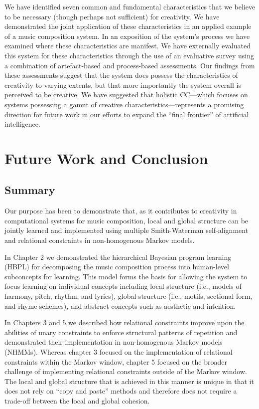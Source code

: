 \documentclass[phd,electronic,oneside,twosidetoc,letterpaper,chaptercenter,parttop,lof,lot]{byumsphd}
\begin{document}
We have identified seven common and fundamental characteristics that we believe to be necessary (though perhaps not sufficient) for creativity. We have demonstrated the joint application of these characteristics in an applied example of a music composition system. In an exposition of the system's process we have examined where these characteristics are manifest. We have externally evaluated this system for these characteristics through the use of an evaluative survey using a combination of artefact-based and process-based assessments. Our findings from these assessments suggest that the system does possess the characteristics of creativity to varying extents, but that more importantly the system overall is perceived to be creative. We have suggested that holistic CC---which focuses on systems possessing a gamut of creative characteristics---represents a promising direction for future work in our efforts to expand the ``final frontier'' of artificial intelligence.

\chapter{Future Work and Conclusion}

\section{Summary}

Our purpose has been to demonstrate that, as it contributes to creativity in computational systems for music composition, local and global structure can be jointly learned and implemented using multiple Smith-Waterman self-alignment and relational constraints in non-homogenous Markov models.

In Chapter 2 we demonstrated the hierarchical Bayesian program learning (HBPL) for decomposing the music composition process into human-level subconcepts for learning. This model forms the basis for allowing the system to focus learning on individual concepts including local structure (i.e., models of harmony, pitch, rhythm, and lyrics), global structure (i.e., motifs, sectional form, and rhyme schemes), and abstract concepts such as aesthetic and intention.

In Chapters 3 and 5 we described how relational constraints improve upon the abilities of unary constraints to enforce structural patterns of repetition and demonstrated their implementation in non-homogenous Markov models (NHMMs). Whereas chapter 3 focused on the implementation of relational constraints within the Markov window, chapter 5 focused on the broader challenge of implementing relational constraints outside of the Markov window. The local and global structure that is achieved in this manner is unique in that it does not rely on ``copy and paste'' methods and therefore does not require a trade-off between the local and global cohesion.
\end{document}
